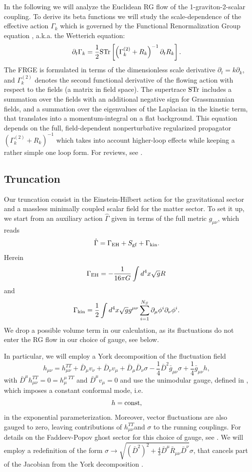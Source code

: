 \documentclass[twocolumn,prd,superscriptaddress,preprintnumbers,amsmath,amssymb,nofootinbib]{revtex4}
\newcommand{\be}{\begin{equation}}
\newcommand{\ee}{\end{equation}}
\begin{document}
In the following we will analyze the Euclidean RG flow of the 1-graviton-2-scalar coupling. 
To derive its beta functions we will study the scale-dependence of the effective action $\Gamma_k$ which is governed by the Functional Renormalization Group equation \cite{Wetterich:1993yh, Morris:1993qb},  a.k.a. the Wetterich equation:
\be
\partial_t \Gamma_k = \frac{1}{2} {\rm STr} \left[\left( \Gamma_k^{(2)}+R_k\right)^{-1} \partial_t R_k \right].
\ee
The FRGE is formulated in terms of the dimensionless scale derivative $\partial_t = k\partial_k$, and $\Gamma_k^{(2)}$ denotes the second functional derivative of the flowing action with respect to the fields (a matrix in field space).
The supertrace $\rm STr$ includes a summation over the fields with an additional negative sign for Grassmannian fields, and a summation over the eigenvalues of the Laplacian in the kinetic term, that translates into a momentum-integral on a flat background. 
This equation depends on the full, field-dependent nonperturbative regularized propagator $\left(\Gamma_k^{(2)}+R_k \right)^{-1}$ which takes into account higher-loop effects while keeping a  rather simple  one loop form.  For reviews, see \cite{FRGreviews}.

%
\subsection{Truncation}
%
Our truncation consist in the Einstein-Hilbert action for the gravitational sector and a massless minimally coupled scalar field for the matter sector. To set it up, we start from an  auxiliary action $\hat{\Gamma}$ given in terms of the full metric $g_{\mu \nu}$, which reads
\be
\hat{\Gamma}= \Gamma_{\rm EH}+ S_{\rm gf} + \Gamma_{\rm kin}.
\ee
Herein
\be
\Gamma_{\rm EH} = -\frac{1}{16 \pi G} \int d^4x \sqrt{g} R\, 
\ee
and
\be
\Gamma_{\rm kin} = \frac{1}{2} \int d^4x \sqrt{g} g^{\mu \nu}\sum_{i=1}^{N_S}\partial_{\mu}\phi^i \partial_{\nu}\phi^i.
\ee
We drop a possible volume term in our calculation, as its fluctuations do not enter the RG flow in our choice of gauge, see below.

In particular, we will employ a York decomposition of the fluctuation field
\be
h_{\mu \nu} = h_{\mu \nu}^{TT} + \bar{D}_{\mu}v_{\nu}+ \bar{D}_{\nu}v_{\mu} + \bar{D}_{\mu}\bar{D}_{\nu}\sigma - \frac{1}{4}\bar{D}^2 \bar{g}_{\mu \nu}\sigma + \frac{1}{4}\bar{g}_{\mu \nu}h,
\ee
with $\bar{D}^{\mu}h_{\mu \nu}^{TT}=0=h^{\mu\, \, TT}_{\mu}$ and $\bar{D}^{\mu}v_{\mu}=0$
and  use the unimodular gauge, defined in \cite{Percacci:2015wwa}, which imposes a constant conformal mode, i.e.
\be
h=\rm const,
\ee
in the exponential parameterization. Moreover, vector fluctuations are also gauged to zero, leaving contributions of $h_{\mu \nu}^{TT}$and $\sigma$ to the running couplings. For details on the Faddeev-Popov ghost sector for this choice of gauge, see \cite{ercacci:2015wwa}.
We will employ a redefinition of the form $ \sigma \rightarrow \sqrt{(\bar{D}^{2})^2+\frac{4}{3}\bar{D}^{\mu}\bar{R}_{\mu \nu}\bar{D}^{\nu}} \sigma$, that cancels part of the Jacobian from the York decomposition \cite{Dou:1997fg}. 
\end{document}
